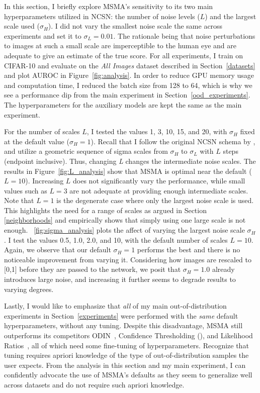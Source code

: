 In this section, I briefly explore MSMA's sensitivity to its two main hyperparameters utilized in NCSN: the number of noise levels ($L$) and the largest scale used ($\sigma_H$). I did not vary the smallest noise scale the same across experiments and set it to $\sigma_L=0.01$. The rationale being that noise perturbations to images at such a small scale are imperceptible to the human eye and are adequate to give an estimate of the true score. For all experiments, I train on CIFAR-10 and evaluate on the \emph{All Images} dataset described in Section~\ref{datasets} and plot AUROC in Figure~\ref{fig:analysis}. In order to reduce GPU memory usage and computation time, I reduced the batch size from 128 to 64, which is why we see a performance dip from the main experiment in Section~\ref{ood_experiments}. The hyperparameters for the auxiliary models are kept the same as the main experiment.

For the number of scales $L$, I tested the values 1, 3, 10, 15, and 20, with $\sigma_H$ fixed at the default value ($\sigma_H=1$). Recall that I follow the original NCSN schema by \cite{Song2019}, and utilize a geometric sequence of sigma scales from $\sigma_H$ to $\sigma_L$ with $L$ steps (endpoint inclusive). Thus, changing \emph{L} changes the intermediate noise scales. The results in Figure~\ref{fig:L_analysis} show that MSMA is optimal near the default ($L=10$). Increasing $L$ does not significantly vary the performance, while small values such as $L=3$ are not adequate at providing enough intermediate scales. Note that $L=1$ is the degenerate case where only the largest noise scale is used. This highlights the need for a range of scales as argued in Section \ref{neighborhoods} and empirically shows that simply using one large scale is not enough. \figurename{~\ref{fig:sigma_analysis}} plots the affect of varying the largest noise scale $\sigma_H$. I test the values 0.5, 1.0, 2.0, and 10, with the default number of scales $L=10$. Again, we observe that our default $\sigma_H=1$ performs the best and there is no noticeable improvement from varying it. Considering how images are rescaled to [0,1] before they are passed to the network, we posit that $\sigma_H=1.0$ already introduces large noise, and increasing it further seems to degrade results to varying degrees. 

Lastly, I would like to emphasize that \emph{all} of my main out-of-distribution experiments in Section~\ref{experiments} were performed with the \emph{same} default hyperparameters, without any tuning. Despite this disadvantage, MSMA still outperforms its competitors ODIN~\cite{Liang2017}, Confidence Thresholding (\cite{Devries}), and Likelihood Ratios~\cite{Ren2019}, all of which need some fine-tuning of hyperparameters. Recognize that tuning requires apriori knowledge of the type of out-of-distribution samples the user expects. From the analysis in this section and my main experiment, I can confidently advocate the use of MSMA's defaults as they seem to generalize well across datasets and do not require such apriori knowledge. 

